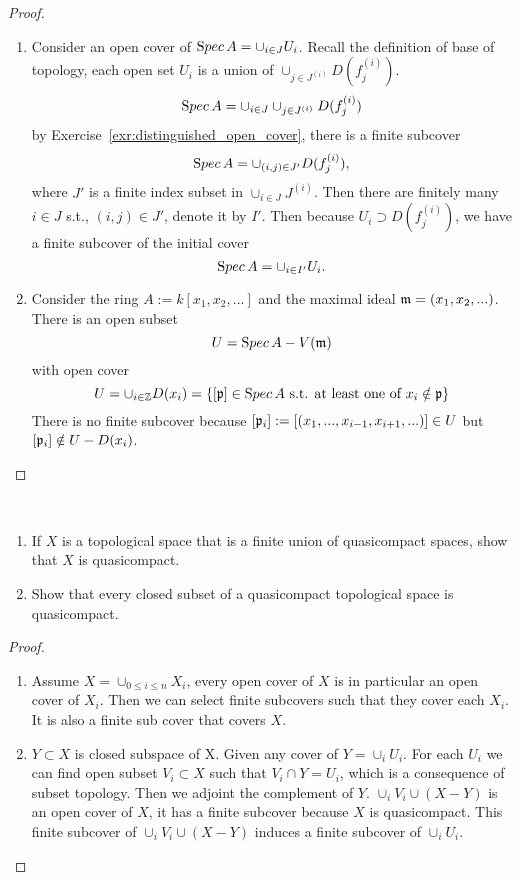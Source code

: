 \documentclass[11pt,fleqn]{book}
\begin{document}
\begin{proof}
\begin{enumerate}[label=(\alph*)]
\item
Consider an open cover of ${\text Spec\,} A=\cup_{i\in J}U_i$. Recall the definition of base of topology, each open set $U_i$ is a union of $\cup_{j\in J^{(i)}}D(f^{(i)}_j)$. 
$$
{\text Spec\,} A=\cup_{i\in J}\cup_{j\in J^{(i)}}D(f^{(i)}_j)
$$
by Exercise~\ref{exr:distinguished_open_cover}, there is a finite subcover
$$
{\text Spec\,} A=\cup_{(i,j)\in J'}D(f^{(i)}_j),
$$
where $J'$ is a finite index subset in $\cup_{i\in J}J^{(i)}$. Then there are finitely many $i\in J$ s.t., $(i,j)\in J'$, denote it by $I'$. Then because $U_i\supset D(f^{(i)}_j)$, we have a finite subcover of the initial cover
$$
{\text Spec\,} A=\cup_{i\in I'} U_i.
$$
\item Consider the ring $A:=k[x_1,x_2,...]$ and the maximal ideal ${\mathfrak m}=(x_1,x_2,...)$. There is an open subset 
$$
U={\text Spec\,} A-V({\mathfrak m})
$$
with open cover
$$
U=\cup_{i\in\mathbb Z} D(x_i)=\{[{\mathfrak p}]\in{\text Spec\,} A\text{ s.t. at least one of $x_i\notin {\mathfrak p}$}\}
$$
There is no finite subcover because $[{\mathfrak p}_i]:=[(x_1,...,x_{i-1},x_{i+1},...)]\in U$ but $[{\mathfrak p}_i]\notin U-D(x_i)$.
\end{enumerate}
\end{proof}

\begin{exr}\ 
\begin{enumerate}[label=(\alph*)]
\item 
 If $X$ is a topological space that is a finite union of quasicompact spaces, show that $X$ is quasicompact.
\item  Show that every closed subset of a quasicompact topological space is quasicompact.
\end{enumerate}
\end{exr}
\begin{proof}
\begin{enumerate}[label=(\alph*)]
\item Assume $X=\cup_{0\leq i\leq n} X_i$, every open cover of $X$ is in particular an open cover of $X_i$. Then we can select finite subcovers such that they cover each $X_i$. It is also a finite sub cover that covers $X$.
\item $Y\subset X$ is closed subspace of X. Given any cover of $Y=\cup_i U_i$. For each $U_i$ we can find open subset $V_i\subset X$ such that $V_i\cap Y=U_i$, which is a consequence of subset topology. Then we adjoint the complement of $Y$. $\cup_{i} V_i\cup (X-Y)$ is an open cover of $X$, it has a finite subcover because $X$ is quasicompact. This finite subcover of $\cup_{i} V_i\cup (X-Y)$ induces a finite subcover of $\cup_{i} U_i$.
\end{enumerate}
\end{proof}
\end{document}
